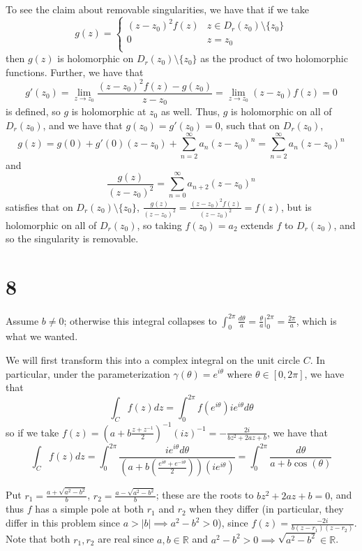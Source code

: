 \documentclass[12pt,letterpaper]{article}
\theoremstyle{definition}
\newcommand{\R}{\mathbb{R}}
\begin{document}
To see the claim about removable singularities, we have that if we take
\[
  g(z) = \begin{cases}
    (z - z_{0})^{2}f(z) & z \in D_{r}(z_{0}) \setminus \{z_{0}\} \\
    0 & z = z_{0} \\
  \end{cases}
\]
then $g(z)$ is holomorphic on $D_{r}(z_{0}) \setminus \{z_{0}\}$ as the product of two holomorphic functions. Further, we have that
\[
  g'(z_{0}) = \lim_{z \rightarrow z_{0}}\frac{(z-z_{0})^{2}f(z) - g(z_{0})}{z - z_{0}} = \lim_{z \rightarrow z_{0}}(z-z_{0})f(z) = 0
\]
is defined, so $g$ is holomorphic at $z_{0}$ as well. Thus, $g$ is holomorphic on all of $D_{r}(z_{0})$, and we have that $g(z_{0}) = g'(z_{0}) = 0$, such that on $D_{r}(z_{0})$,
\[
  g(z) = g(0) + g'(0)(z - z_{0}) + \sum_{n=2}^{\infty}a_{n}(z - z_{0})^{n} = \sum_{n=2}^{\infty}a_{n}(z-z_{0})^{n}
\]
and
\[
  \frac{g(z)}{(z - z_{0})^{2}} = \sum_{n=0}^{\infty}a_{n+2}(z-z_{0})^{n}
\]
satisfies that on $D_{r}(z_{0}) \setminus \{z_{0}\}$, $\frac{g(z)}{(z-z_{0})^{2}} = \frac{(z-z_{0})^{2}f(z)}{(z-z_{0})^{2}} = f(z)$, but is holomorphic on all of $D_{r}(z_{0})$, so taking $f(z_{0}) = a_{2}$ extends $f$ to $D_{r}(z_{0})$, and so the singularity is removable.

\section*{8}

Assume $b \neq 0$; otherwise this integral collapses to $\int_{0}^{2\pi}\frac{d\theta}{a} = \frac{\theta}{a}\Big|_{0}^{2\pi} = \frac{2\pi}{a}$, which is what we wanted.

We will first transform this into a complex integral on the unit circle $C$. In particular, under the parameterization $\gamma(\theta) = e^{i\theta}$ where $\theta \in [0, 2\pi]$, we have that
\[
  \int_{C}f(z)dz = \int_{0}^{2\pi}f(e^{i\theta})ie^{i\theta}d\theta
\]
so if we take $f(z) = \left(a + b\frac{z + z^{-1}}{2}\right)^{-1}(iz)^{-1} = -\frac{2i}{bz^{2} + 2az + b}$, we have that
\[
  \int_{C}f(z)dz = \int_{0}^{2\pi}\frac{ie^{i\theta}d\theta}{\left(a + b\left(\frac{e^{i\theta} + e^{-i\theta}}{2}\right)\right)(ie^{i\theta})} = \int_{0}^{2\pi}\frac{d\theta}{a + b\cos(\theta)}
\]

Put $r_{1} = \frac{a + \sqrt{a^{2} - b^{2}}}{b}$, $r_{2} = \frac{a - \sqrt{a^{2} - b^{2}}}{b}$; these are the roots to $bz^{2} + 2az + b = 0$, and thus $f$ has a simple pole at both $r_{1}$ and $r_{2}$ when they differ (in particular, they differ in this problem since $a > |b| \implies a^{2} - b^{2} > 0$), since $f(z) = \frac{-2i}{b(z-r_{1})(z-r_{2})}$. Note that both $r_{1}, r_{2}$ are real since $a, b \in \R$ and $a^{2} - b^{2} > 0 \implies \sqrt{a^{2} - b^{2}} \in \R$.
\end{document}
